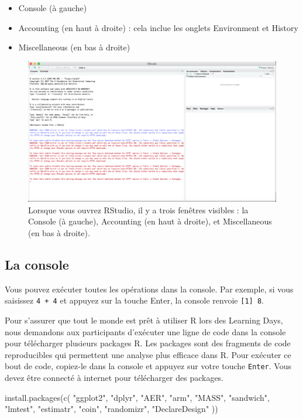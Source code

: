 \documentclass[
  12pt,
]{book}
\newenvironment{Shaded}{\begin{snugshade}}{\end{snugshade}}
\newcommand{\FunctionTok}[1]{\textcolor[rgb]{0.00,0.00,0.00}{#1}}
\newcommand{\NormalTok}[1]{#1}
\newcommand{\StringTok}[1]{\textcolor[rgb]{0.31,0.60,0.02}{#1}}
\providecommand{\tightlist}{%
  \setlength{\itemsep}{0pt}\setlength{\parskip}{0pt}}
\begin{document}
\begin{itemize}
\tightlist
\item
  Console (à gauche)
\item
  Accounting (en haut à droite) : cela inclue les onglets Environment et History
\item
  Miscellaneous (en bas à droite)
\end{itemize}

\begin{figure}
\includegraphics[width=0.8\linewidth]{Images/rstudio_intro} \caption{Lorsque vous ouvrez RStudio, il y a trois fenêtres visibles : la Console (à gauche), Accounting (en haut à droite), et Miscellaneous (en bas à droite).}\label{fig:rstudiointro}
\end{figure}

\hypertarget{la-console}{%
\subsection{La console}\label{la-console}}

Vous pouvez exécuter toutes les opérations dans la console. Par exemple, si vous saisissez \texttt{4\ +\ 4} et appuyez sur la touche Enter, la console renvoie \texttt{{[}1{]}\ 8}.

Pour s'assurer que tout le monde est prêt à utiliser R lors des Learning Days, nous demandons aux participants d'exécuter une ligne de code dans la console pour télécharger plusieurs packages R. Les packages sont des fragments de code reproducibles qui permettent une analyse plus efficace dans R. Pour exécuter ce bout de code, copiez-le dans la console et appuyez sur votre touche \texttt{Enter}. Vous devez être connecté à internet pour télécharger des packages.

\begin{Shaded}
\begin{Highlighting}[]
\FunctionTok{install.packages}\NormalTok{(}\FunctionTok{c}\NormalTok{(}
  \StringTok{"ggplot2"}\NormalTok{, }\StringTok{"dplyr"}\NormalTok{, }\StringTok{"AER"}\NormalTok{, }\StringTok{"arm"}\NormalTok{, }\StringTok{"MASS"}\NormalTok{, }\StringTok{"sandwich"}\NormalTok{,}
  \StringTok{"lmtest"}\NormalTok{, }\StringTok{"estimatr"}\NormalTok{, }\StringTok{"coin"}\NormalTok{, }\StringTok{"randomizr"}\NormalTok{, }\StringTok{"DeclareDesign"}
\NormalTok{))}
\end{Highlighting}
\end{Shaded}
\end{document}
